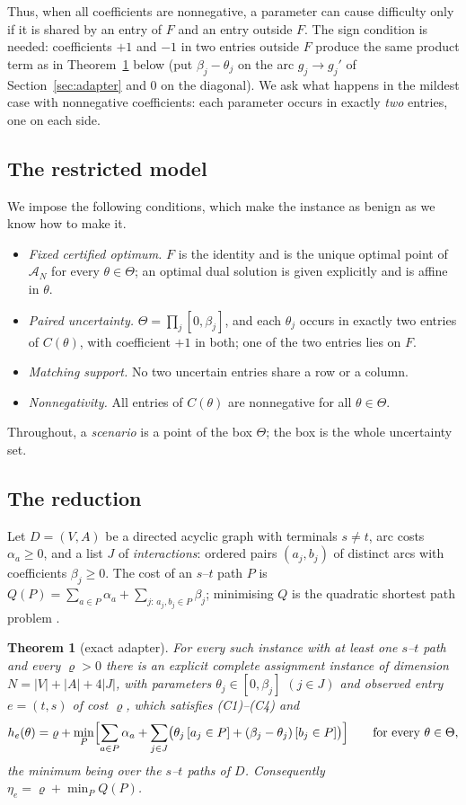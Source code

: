 \documentclass[11pt]{amsart}
\theoremstyle{plain}
\newtheorem{theorem}{Theorem}
\theoremstyle{definition}
\theoremstyle{remark}
\newcommand{\cA}{\mathcal{A}}
\begin{document}
Thus, when all coefficients are nonnegative, a parameter can cause difficulty only if it is shared by an entry of
$F$ and an entry outside $F$. The sign condition is needed: coefficients $+1$ and $-1$ in two entries outside $F$
produce the same product term as in Theorem~\ref{thm:adapter} below (put $\beta_j-\theta_j$ on the arc $g_j\to g_j'$
of Section~\ref{sec:adapter} and $0$ on the diagonal). We ask what happens in the mildest case with nonnegative
coefficients: each parameter occurs in exactly \emph{two} entries, one on each side.

\subsection*{The restricted model}
We impose the following conditions, which make the instance as benign as we know how to make it.
\begin{itemize}
\item[(C1)] \emph{Fixed certified optimum.} $F$ is the identity and is the unique optimal point of $\cA_N$ for every
  $\theta\in\Theta$; an optimal dual solution is given explicitly and is affine in $\theta$.
\item[(C2)] \emph{Paired uncertainty.} $\Theta=\prod_j[0,\beta_j]$, and each $\theta_j$ occurs in exactly two entries
  of $C(\theta)$, with coefficient $+1$ in both; one of the two entries lies on $F$.
\item[(C3)] \emph{Matching support.} No two uncertain entries share a row or a column.
\item[(C4)] \emph{Nonnegativity.} All entries of $C(\theta)$ are nonnegative for all $\theta\in\Theta$.
\end{itemize}
Throughout, a \emph{scenario} is a point of the box $\Theta$; the box is the whole uncertainty set.

\subsection*{The reduction}
Let $D=(V,A)$ be a directed acyclic graph with terminals $s\ne t$, arc costs $\alpha_a\ge0$, and a list $J$ of
\emph{interactions}: ordered pairs $(a_j,b_j)$ of distinct arcs with coefficients $\beta_j\ge0$. The cost of an
$s$--$t$ path $P$ is $Q(P)=\sum_{a\in P}\alpha_a+\sum_{j:\,a_j,b_j\in P}\beta_j$; minimising $Q$ is the quadratic
shortest path problem \cite{Rostami,HuSotirov}.

\begin{theorem}[exact adapter]\label{thm:adapter}
For every such instance with at least one $s$--$t$ path and every $\varrho>0$ there is an explicit complete
assignment instance of dimension
$N=|V|+|A|+4|J|$, with parameters $\theta_j\in[0,\beta_j]$ $(j\in J)$ and observed entry $e=(t,s)$ of cost $\varrho$,
which satisfies \textup{(C1)--(C4)} and
\[
 h_e(\theta)=\varrho+\min_{P}\Bigl[\sum_{a\in P}\alpha_a
      +\sum_{j\in J}\bigl(\theta_j\,[a_j\in P]+(\beta_j-\theta_j)\,[b_j\in P]\bigr)\Bigr]
 \qquad\text{for every }\theta\in\Theta ,
\]
the minimum being over the $s$--$t$ paths of $D$. Consequently $\eta_e=\varrho+\min_PQ(P)$.
\end{theorem}
\end{document}

